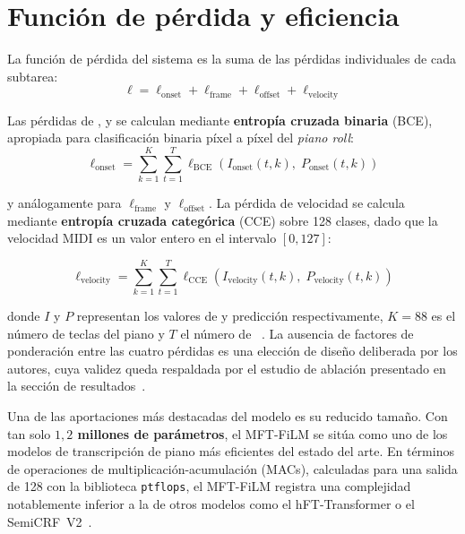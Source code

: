 \documentclass[11pt,spanish,listoffigures,listoftables]{tfgetsinf}
\begin{document}
\section{Función de pérdida y eficiencia}
\label{sec:mft_loss_eff}
La función de pérdida del sistema es la suma de las pérdidas individuales de cada subtarea:
\begin{equation}
  \ell = \ell_{\text{onset}} + \ell_{\text{frame}} + \ell_{\text{offset}} + \ell_{\text{velocity}}
  \label{eq:loss_total}
\end{equation}

Las pérdidas de ,  y  se calculan mediante \textbf{entropía cruzada binaria} (BCE), apropiada para clasificación binaria píxel a píxel del \textit{piano roll}:
\begin{equation}
  \ell_{\text{onset}} = \sum_{k=1}^{K} \sum_{t=1}^{T}
    \ell_{\text{BCE}}\!\left(I_{\text{onset}}(t,k),\; P_{\text{onset}}(t,k)\right)
  \label{eq:loss_onset}
\end{equation}

\noindent y análogamente para $\ell_{\text{frame}}$ y $\ell_{\text{offset}}$. La pérdida de
velocidad se calcula mediante \textbf{entropía cruzada categórica} (CCE) sobre 128 clases,
dado que la velocidad MIDI es un valor entero en el intervalo $[0, 127]$:

\begin{equation}
  \ell_{\text{velocity}} = \sum_{k=1}^{K} \sum_{t=1}^{T}
    \ell_{\text{CCE}}\!\left(I_{\text{velocity}}(t,k),\; P_{\text{velocity}}(t,k)\right)
  \label{eq:loss_vel}
\end{equation}

\noindent donde $I$ y $P$ representan los valores de  y
predicción respectivamente, $K = 88$ es el número de teclas del piano y $T$ el número de
~\cite{wang2025mftfilm}. La ausencia de factores de ponderación
entre las cuatro pérdidas es una elección de diseño deliberada por los autores, cuya validez queda respaldada
por el estudio de ablación presentado en la sección de resultados~\cite{wang2025mftfilm}.

Una de las aportaciones más destacadas del modelo es su reducido tamaño. Con tan solo \textbf{$1{,}2$ millones de parámetros}, el MFT-FiLM se sitúa como uno de los modelos de transcripción de piano más eficientes
del estado del arte. En términos de operaciones de multiplicación-acumulación (MACs), calculadas para una salida de 128  con la biblioteca \texttt{ptflops}, el MFT-FiLM registra una complejidad notablemente inferior a la de otros modelos como el hFT-Transformer o el SemiCRF~V2~\cite{wang2025mftfilm,toyama2023hftt,yan2024transkun}.
\end{document}
